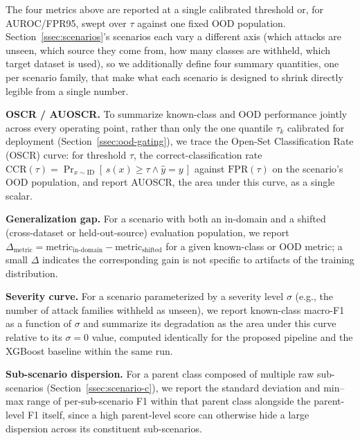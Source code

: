 \documentclass[sigconf]{acmart}
\begin{document}
The four metrics above are reported at a single calibrated threshold or, for AUROC/FPR95, swept over $\tau$ against one fixed OOD population. Section~\ref{ssec:scenarios}'s scenarios each vary a different axis (which attacks are unseen, which source they come from, how many classes are withheld, which target dataset is used), so we additionally define four summary quantities, one per scenario family, that make what each scenario is designed to shrink directly legible from a single number.

\textbf{OSCR / AUOSCR.} To summarize known-class and OOD performance jointly across every operating point, rather than only the one quantile $\tau_k$ calibrated for deployment (Section~\ref{ssec:ood-gating}), we trace the Open-Set Classification Rate (OSCR) curve: for threshold $\tau$, the correct-classification rate $\mathrm{CCR}(\tau) = \Pr_{x \sim \text{ID}}[\,s(x) \geq \tau \wedge \hat{y} = y\,]$ against $\mathrm{FPR}(\tau)$ on the scenario's OOD population, and report AUOSCR, the area under this curve, as a single scalar. %

\textbf{Generalization gap.} For a scenario with both an in-domain and a shifted (cross-dataset or held-out-source) evaluation population, we report $\Delta_{\text{metric}} = \text{metric}_{\text{in-domain}} - \text{metric}_{\text{shifted}}$ for a given known-class or OOD metric; a small $\Delta$ indicates the corresponding gain is not specific to artifacts of the training distribution.

\textbf{Severity curve.} For a scenario parameterized by a severity level $\sigma$ (e.g., the number of attack families withheld as unseen), we report known-class macro-F1 as a function of $\sigma$ and summarize its degradation as the area under this curve relative to its $\sigma = 0$ value, computed identically for the proposed pipeline and the XGBoost baseline within the same run.

\textbf{Sub-scenario dispersion.} For a parent class composed of multiple raw sub-scenarios (Section~\ref{ssec:scenario-c}), we report the standard deviation and min--max range of per-sub-scenario F1 within that parent class alongside the parent-level F1 itself, since a high parent-level score can otherwise hide a large dispersion across its constituent sub-scenarios.
\end{document}

